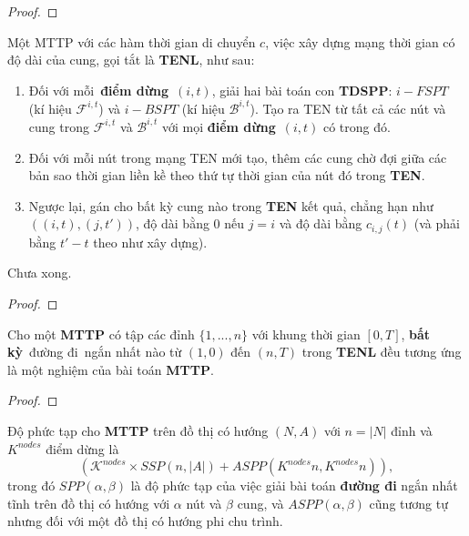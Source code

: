 \documentclass[../main.tex]{subfiles}
\begin{document}
\begin{proof}
\end{proof}

\begin{definition}
Một MTTP với các hàm thời gian di chuyển \(c\),
việc xây dựng mạng thời gian có độ dài của cung, gọi tắt là
\textbf{TENL}, như sau:

\begin{enumerate}
\def\labelenumi{\arabic{enumi}.}
\tightlist
\item
  Đối với mỗi~\textbf{điểm dừng}~\((i, t)\), giải hai bài toán con
  \textbf{TDSPP}: \(i-FSPT\) (kí hiệu \(\mathcal F^{i,t}\)) và \(i-BSPT\)
  (kí hiệu \(\mathcal B^{i,t}\)). Tạo ra TEN từ tất cả các nút và cung trong
  \(\mathcal F^{i,t}\) và \(\mathcal B^{i,t}\) với mọi \textbf{điểm
  dừng}~\((i,t)\) có trong đó.
\item
  Đối với mỗi nút trong mạng TEN mới tạo, thêm các cung chờ đợi giữa các
  bản sao thời gian liền kề theo thứ tự thời gian của nút đó trong
  \textbf{TEN}.
\item
  Ngược lại, gán cho bất kỳ cung nào trong \textbf{TEN} kết quả, chẳng
  hạn như \(((i, t), (j, t' ))\), độ dài bằng \(0\) nếu \(j = i\) và độ
  dài bằng \(c_{i,j} (t)\) (và phải bằng \(t' − t\) theo như xây dựng).
\end{enumerate}

Chưa xong.
\end{definition}

\begin{proof} \end{proof}

\begin{corollary}
\label{col:mttp}
Cho một \textbf{MTTP} có tập các đỉnh
\(\{1,...,n\}\) với khung thời gian \([0,T]\), \textbf{bất kỳ}~đường
đi~ngắn nhất nào từ \((1,0)\) đến \((n,T)\) trong \textbf{TENL} đều
tương ứng là một nghiệm của bài toán \textbf{MTTP}.
\end{corollary}

\begin{proof} \end{proof}

\begin{proposition}
\label{prp:dpt-mttp}
Độ phức tạp cho \textbf{MTTP} trên đồ thị
có hướng \((N,A)\) với \(n = |N|\) đỉnh và \(K^{nodes}\) điểm dừng là
\[ (\mathcal{K}^{nodes} ×SSP(n,|A|)+ASPP(K^{nodes}n,K^{nodes}n)), \]
trong đó \(SPP(\alpha,\beta)\) là độ phức tạp của việc giải bài toán
\textbf{đường đi} ngắn nhất tĩnh trên đồ thị có hướng với \(\alpha\) nút
và \(\beta\) cung, và \(ASPP(\alpha,\beta)\) cũng tương tự nhưng đối với
một đồ thị có hướng phi chu trình.
\end{proposition}
\end{document}
